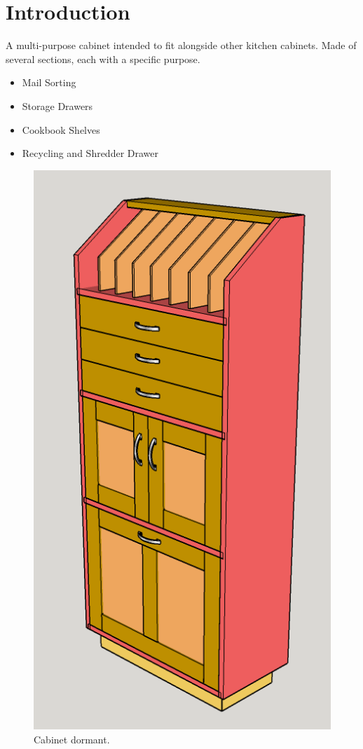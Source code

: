 \section{Introduction}
A multi-purpose cabinet intended to fit alongside other kitchen cabinets. Made of several sections, each with a specific purpose.

\begin{itemize}
    \item Mail Sorting
    \item Storage Drawers
    \item Cookbook Shelves
    \item Recycling and Shredder Drawer
\end{itemize}

\begin{figure}[!ht]
    \centering
    \includegraphics[height=0.75\textheight]{img/krs1} 
    \caption{Cabinet dormant.\label{fig:intro1}}
    
\end{figure}

